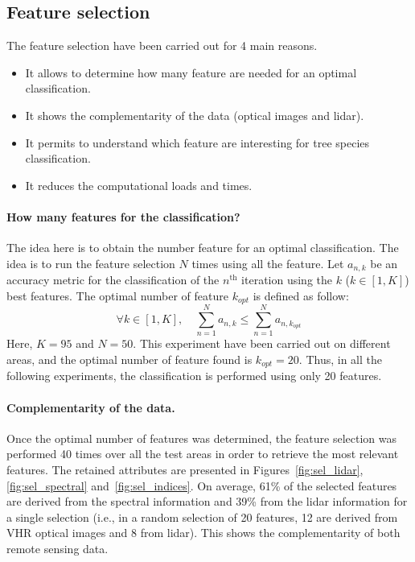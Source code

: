 \subsection{Feature selection}

The feature selection have been carried out for 4 main reasons.
\begin{itemize}
\item It allows to determine how many feature are needed for an optimal classification.
\item It shows the complementarity of the data (optical images and lidar).
\item It permits to understand which feature are interesting for tree species classification.
\item It reduces the computational loads and times.
\end{itemize}

\paragraph{How many features for the classification? \\}
The idea here is to obtain the number feature for an optimal classification. The idea is to run the feature selection $N$ times using all the feature. Let $a_{n,k}$ be an accuracy metric for the classification of the $n^{\text{th}}$ iteration using the $k$ ($k \in [1,K]$) best features.
The optimal number of feature $k_{opt}$ is defined as follow:
\begin{equation}
\forall k \in [1,K], \quad \sum_{n=1}^{N}a_{n,k} \leq \sum_{n=1}^{N}a_{n,k_{opt}}
\end{equation}
Here, $K=95$ and $N=50$. This experiment have been carried out on different areas, and the optimal number of feature found is $k_{opt}=20$. Thus, in all the following experiments, the classification is performed using only 20 features.

\paragraph{Complementarity of the data. \\}
Once the optimal number of features was determined, the feature selection was performed 40 times over all the test areas in order to retrieve the most relevant features. The retained attributes are presented in Figures~\ref{fig:sel_lidar},\ref{fig:sel_spectral} and~\ref{fig:sel_indices}. On average, 61\% of the selected features are derived from the spectral information and 39\% from the lidar information for a single selection (i.e., in a random selection of 20 features, 12 are derived from VHR optical images and 8 from lidar). This shows the complementarity of both remote sensing data. 

